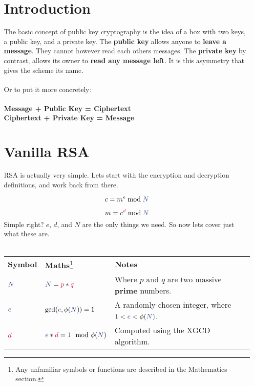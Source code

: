 
\section{Introduction}

	The basic concept of public key cryptography is the idea of a box with two keys, a public key, and a private key. The \textbf{public key} allows anyone to \textbf{leave a message}. They cannot however read each others messages. The \textbf{private key} by contrast, allows its owner to \textbf{read any message left}. It is this asymmetry that gives the scheme its name.\\
	\\
	Or to put	it more concretely:\\
	\\
	\textbf{Message + \textcolor{B}{Public Key} = Ciphertext}\\
	\textbf{Ciphertext + \textcolor{R}{Private Key} = Message}\\

\section{Vanilla RSA}

	RSA is actually very simple. Lets start with the encryption and decryption definitions, and work back from there.

	$$ c = m^{\textcolor{B}{e}} \bmod \textcolor{B}{N} $$

	$$ m = c^{\textcolor{R}{d}} \bmod \textcolor{B}{N} $$
	Simple right? $e$, $d$, and $N$ are the only things we need. So now lets cover just what these are.\\
	\\
  \begin{tabularx}{\linewidth}{l l X}
  \textbf{Symbol} & \textbf{Maths}\footnote{Any unfamiliar symbols or functions are described in the Mathematics section.} & \textbf{Notes}\\
  $\textcolor{B}{N}$ & $\textcolor{B}{N} = \textcolor{R}{p} * \textcolor{R}{q}$ & Where $p$ and $q$ are two massive \textbf{prime} numbers.
  \\
  $\textcolor{B}{e}$ & $\gcd(\textcolor{B}{e},\phi(\textcolor{B}{N}))=1$ & A randomly chosen integer, where $1 < \textcolor{B}{e} < \phi(\textcolor{B}{N})$.
  \\
  $\textcolor{R}{d}$ & $\textcolor{B}{e}*\textcolor{R}{d} = 1 \mod \phi(\textcolor{B}{N})$ & Computed using the XGCD algorithm.
  \\
  \end{tabularx}


